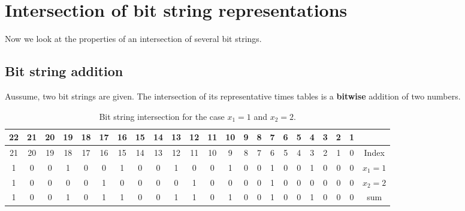 \chapter{Intersection of bit string representations}
\label{ch:intersectionofbitstringrepresentations}
\minitoc
Now we look at the properties of an intersection of several bit strings.
\section{Bit string addition}
\label{s:bitstringaddition}
Aussume, two bit strings are given. The intersection of its representative times tables is a \textbf{bitwise} addition of two numbers.

\begin{table}[H]
\centering
\caption{Bit string intersection for the case $x_{1} = 1$ and $x_{2} = 2$.}
\tiny
\begin{tabular}{cccccccccccccccccccccc||c}
				\cellcolor{yellow} 22 & 21 & 20 & 19 & 18 & 17 & 16 & 15 & 14 & 13 & 12 & 11 & 10 & 9 & 8 & \cellcolor{yellow} 7 & 6 & 5 & 4 & 3 & 2 & 1 & \\
\hline				21 & 20 & 19 & 18 & 17 & 16 & 15 & 14 & 13 & 12 & 11 & 10 & 9  & 8 & 7 & 6 & 5 & 4 & 3 & 2 & 1 & 0 & Index \\
\hline\hline \rowcolor{green}   \cellcolor{cyan} 1 &  0 &  0 &  \cellcolor{red} 1 &  0 &  \cellcolor{red} 0 &  \cellcolor{red} 1 &  0 &  0 &  \cellcolor{red} 1 &  \cellcolor{red} 0 &  0 &  \cellcolor{red} 1 & 0 & 0 & \cellcolor{cyan} 1 & 0 & 0 & \cellcolor{red} 1 & 0 & 0 & 0 & $x_{1} = 1$ \\
	     \rowcolor{green}   \cellcolor{cyan} 1 &  0 &  0 &  \cellcolor{red} 0 &  0 &  \cellcolor{red} 1 &  \cellcolor{red} 0 &  0 &  0 &  \cellcolor{red} 0 &  \cellcolor{red} 1 &  0 &  \cellcolor{red} 0 & 0 & 0 & \cellcolor{cyan} 1 & 0 & 0 & \cellcolor{red} 0 & 0 & 0 & 0 & $x_{2} = 2$ \\
\hline	     \rowcolor{green}	 \cellcolor{cyan} 1 &  0 &  0 &  \cellcolor{red} 1 &  0 &  \cellcolor{red} 1 &  \cellcolor{red} 1 &  0 &  0 &  \cellcolor{red} 1 &  \cellcolor{red} 1 &  0 &  \cellcolor{red} 1 & 0 & 0 & \cellcolor{cyan} 1 & 0 & 0 & \cellcolor{red} 1 & 0 & 0 & 0 & sum \\
\end{tabular}
\label{tab:intersectionx1_1+x2_2}
\end{table}

